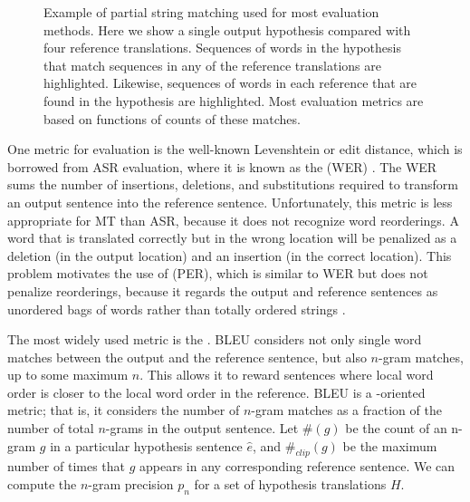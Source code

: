 \figpreamble
\begin{figure*}[t]
\figfontsize{\begin{center}

\end{center}}
\figpostamble
\caption[Example of partial string matching used for most evaluation methods]{Example of partial string matching used for most
evaluation methods.  Here we show a single output hypothesis
compared with four reference translations.  Sequences of words
in the hypothesis that match sequences in any of the reference
translations are highlighted.  Likewise, sequences of words in 
each reference that are found in the hypothesis are highlighted.
Most evaluation metrics are based on functions of counts of
these matches.}
\label{fig:multi-evaluation}
\end{figure*}

One metric for evaluation is the well-known
Levenshtein or edit distance, which is borrowed
from ASR evaluation, where it is known as the
 (WER) \citep{Och:1999:emnlp}.
The WER sums the number of insertions, deletions,
and substitutions required to transform an
output sentence into the reference sentence.  Unfortunately, 
this metric is less appropriate for MT than ASR,
because it does not recognize word reorderings.  A
word that is translated correctly but in the wrong
location will be penalized as a deletion (in the 
output location) and an insertion (in the correct
location).  This problem motivates the use
of 
(PER), which is similar to WER but does not
penalize reorderings, because it regards the 
output and reference sentences as unordered 
bags of words rather than totally ordered strings
\citep{Och:1999:emnlp}.

The most widely
used metric is the 
\citep[BLEU;][]{Papineni:2002:acl}.  BLEU 
considers not only single word matches between the 
output and the reference sentence, but also 
$n$-gram matches, up to some maximum $n$.  This allows
it to reward sentences where local word order is closer
to the local word order in the reference.  BLEU
is a -oriented metric;
that is, it considers the number of $n$-gram 
matches as a fraction of the number of total $n$-grams
in the output sentence.  Let $\#(g)$ be the count 
of an n-gram $g$ in a particular hypothesis 
sentence $\hat{e}$, and $\#_{clip}(g)$ be the maximum 
number of times that $g$ appears in any corresponding 
reference sentence.  We can compute the $n$-gram precision $p_n$
for a set of hypothesis translations $H$.

